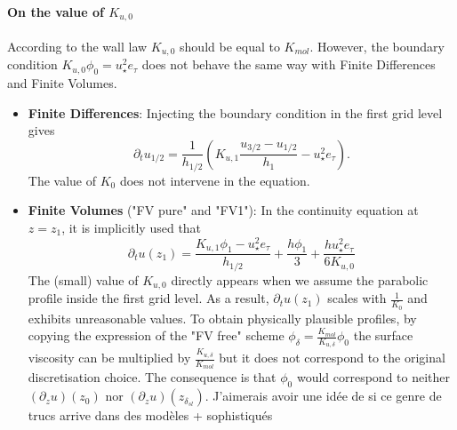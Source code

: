 \paragraph{On the value of $K_{u,0}$}
\label{sec:ND_StratifiedCase_viscosity0_FVpure}
According to the wall law $K_{u,0}$ should be equal to $K_{mol}$.
However, the boundary condition $K_{u,0} \phi_0 = u_\star^2 e_\tau$
does not behave the same way with Finite Differences and Finite
Volumes.
\begin{itemize}
	\item \textbf{Finite Differences}:
Injecting the boundary condition in the first grid level gives
		\begin{equation}
			\partial_t u_{1/2} = \frac{1}{h_{1/2}}
			\left(K_{u,1}\frac{u_{3/2} - u_{1/2}}{h_1}
			 - u_\star^2 e_\tau \right).
		\end{equation}
The value of $K_0$ does not intervene in the equation.
\item \textbf{Finite Volumes} ("FV pure" and "FV1"):
In the continuity equation at $z=z_1$, it is implicitly used that
	\begin{equation}
		\partial_t u(z_1) =
		\frac{K_{u,1} \phi_1 - u_\star^2 e_\tau} {h_{1/2}}
		+ \frac{h \phi_1}{3}
		+ \frac{h u_\star^2 e_\tau}{6 K_{u,0}}
	\end{equation}
The (small) value of $K_{u,0}$ directly appears when we assume the
parabolic profile inside the first grid level.
As a result, $\partial_t u(z_1)$ scales with $\frac{1}{K_0}$ and
exhibits unreasonable values.
To obtain physically plausible profiles,
by copying the expression of the "FV free" scheme
$\phi_{\delta} = \frac{K_{mol}}{K_{u,\delta}}\phi_0$ the surface
viscosity can be multiplied by $\frac{K_{u,\delta}}{K_{mol}}$
but it does not correspond to the original discretisation choice.
The consequence is that $\phi_0$ would correspond
to neither $(\partial_z u)(z_0)$ nor
		$(\partial_z u)(z_{\delta_{sl}})$.
{\color{red} J'aimerais avoir une idée de si ce genre de trucs
		arrive dans des modèles + sophistiqués}
\end{itemize}

